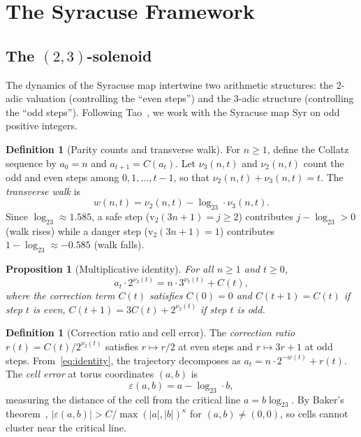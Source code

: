 \documentclass{CUP-JNL-FMP}%
\newtheorem{proposition}[theorem]{Proposition}
\theoremstyle{definition}
\newtheorem{definition}[theorem]{Definition}
\numberwithin{equation}{section}
\newcommand{\Syr}{\mathrm{Syr}}
\newcommand{\val}{\mathrm{v}_2}
\newcommand{\logb}{\log_2}
\begin{document}
\section{The Syracuse Framework}\label{sec:framework}

\subsection{The $(2,3)$-solenoid}

The dynamics of the Syracuse map intertwine two arithmetic structures: the
$2$-adic valuation (controlling the ``even steps'') and the $3$-adic structure
(controlling the ``odd steps''). Following Tao~\cite{Tao2022}, we work with the
Syracuse map $\Syr$ on odd positive integers.

\begin{definition}[Parity counts and transverse walk]\label{def:parity-counts}
  For $n \geq 1$, define the Collatz sequence by $a_0 = n$ and
  $a_{t+1} = C(a_t)$.  Let $\nu_3(n,t)$ and $\nu_2(n,t)$ count the odd
  and even steps among $0, 1, \ldots, t-1$, so that
  $\nu_2(n,t) + \nu_3(n,t) = t$.  The \emph{transverse walk} is
  \begin{equation}\label{eq:walk}
    w(n,t) = \nu_2(n,t) - \logb 3 \cdot \nu_3(n,t).
  \end{equation}
  Since $\logb 3 \approx 1.585$, a safe step ($\val(3n+1) = j \geq 2$)
  contributes $j - \logb 3 > 0$ (walk rises) while a danger step
  ($\val(3n+1) = 1$) contributes $1 - \logb 3 \approx -0.585$ (walk falls).
\end{definition}

\begin{proposition}[Multiplicative identity]\label{prop:identity}
  For all $n \geq 1$ and $t \geq 0$,
  \begin{equation}\label{eq:identity}
    a_t \cdot 2^{\nu_2(t)} = n \cdot 3^{\nu_3(t)} + C(t),
  \end{equation}
  where the \emph{correction term} $C(t)$ satisfies $C(0) = 0$ and
  $C(t+1) = C(t)$ if step $t$ is even, $C(t+1) = 3C(t) + 2^{\nu_2(t)}$
  if step $t$ is odd.
\end{proposition}

\begin{definition}[Correction ratio and cell error]\label{def:correction-ratio}
  The \emph{correction ratio} $r(t) = C(t)/2^{\nu_2(t)}$ satisfies
  $r \mapsto r/2$ at even steps and $r \mapsto 3r + 1$ at odd steps.
  From~\eqref{eq:identity}, the trajectory decomposes as
  $a_t = n \cdot 2^{-w(t)} + r(t)$.
  The \emph{cell error} at torus coordinates $(a, b)$ is
  \begin{equation}\label{eq:cellerror}
    \varepsilon(a, b) = a - \logb 3 \cdot b,
  \end{equation}
  measuring the distance of the cell from the critical line $a = b \logb 3$.
  By Baker's theorem~\cite{Baker1975}, $|\varepsilon(a,b)| > C/\max(|a|,|b|)^\kappa$
  for $(a,b) \neq (0,0)$, so cells cannot cluster near the critical line.
\end{definition}
\end{document}
